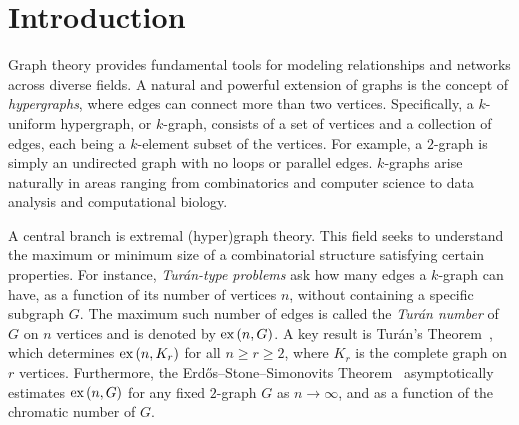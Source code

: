 \section{Introduction}\label{sec:introduction}

Graph theory provides fundamental tools for modeling relationships and networks across diverse fields.
A natural and powerful extension of graphs is the concept of \emph{hypergraphs},
where edges can connect more than two vertices.
Specifically, a $k$-uniform hypergraph, or $k$-graph,
consists of a set of vertices and a collection of edges, each being a $k$-element subset of the vertices.
For example, a $2$-graph is simply an undirected graph with no loops or parallel edges.
$k$-graphs arise naturally in areas ranging from combinatorics and computer science to data analysis and
computational biology.

A central branch is extremal (hyper)graph theory.
This field seeks to understand the maximum or minimum size of a combinatorial structure satisfying certain properties.
For instance, \emph{Turán-type problems} ask how many edges a $k$-graph can have, as a function of its number of vertices $n$,
without containing a specific subgraph $G$.
The maximum such number of edges is called the \emph{Turán number} of $G$ on $n$ vertices and is denoted by $\text{ex} \left( n, G \right)$.
A key result is Turán's Theorem~\cite{Turan1941},
which determines $\text{ex} \left( n, K_r \right)$ for all $n \geq r \geq 2$, where $K_r$ is the complete graph on $r$ vertices.
Furthermore, the Erdős--Stone--Simonovits Theorem~\cite{erdos1946structure}
asymptotically estimates $\text{ex} \left( n, G \right)$ for any fixed $2$-graph $G$ as $n \to \infty$,
and as a function of the chromatic number of $G$.

